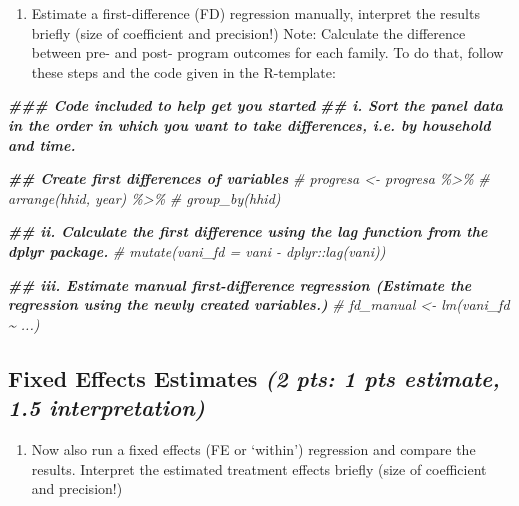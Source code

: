 \documentclass[
]{article}
\newenvironment{Shaded}{\begin{snugshade}}{\end{snugshade}}
\newcommand{\CommentTok}[1]{\textcolor[rgb]{0.56,0.35,0.01}{\textit{#1}}}
\newcommand{\DocumentationTok}[1]{\textcolor[rgb]{0.56,0.35,0.01}{\textbf{\textit{#1}}}}
\providecommand{\tightlist}{%
  \setlength{\itemsep}{0pt}\setlength{\parskip}{0pt}}
\begin{document}
\begin{enumerate}
\def\labelenumi{\alph{enumi})}
\tightlist
\item
  Estimate a first-difference (FD) regression manually, interpret the
  results briefly (size of coefficient and precision!) \indent *Note:
  Calculate the difference between pre- and post- program outcomes for
  each family. To do that, follow these steps and the code given in the
  R-template:
\end{enumerate}

\begin{Shaded}
\begin{Highlighting}[]
\DocumentationTok{\#\#\# Code included to help get you started}
\DocumentationTok{\#\# i. Sort the panel data in the order in which you want to take differences, i.e. by household and time.}

\DocumentationTok{\#\# Create first differences of variables}
\CommentTok{\# progresa \textless{}{-} progresa \%\textgreater{}\% }
\CommentTok{\#   arrange(hhid, year) \%\textgreater{}\% }
\CommentTok{\#   group\_by(hhid)}

\DocumentationTok{\#\# ii. Calculate the first difference using the lag function from the dplyr package.}
\CommentTok{\#     mutate(vani\_fd = vani {-} dplyr::lag(vani)) }

\DocumentationTok{\#\# iii. Estimate manual first{-}difference regression (Estimate the regression using the newly created variables.)}
\CommentTok{\# fd\_manual \textless{}{-} lm(vani\_fd \textasciitilde{} ...)}
\end{Highlighting}
\end{Shaded}

\hypertarget{fixed-effects-estimates-2-pts-1-pts-estimate-1.5-interpretation}{%
\subsection{\texorpdfstring{Fixed Effects Estimates \emph{(2 pts: 1 pts
estimate, 1.5
interpretation)}}{Fixed Effects Estimates (2 pts: 1 pts estimate, 1.5 interpretation)}}\label{fixed-effects-estimates-2-pts-1-pts-estimate-1.5-interpretation}}

\begin{enumerate}
\def\labelenumi{\alph{enumi})}
\setcounter{enumi}{1}
\tightlist
\item
  Now also run a fixed effects (FE or `within') regression and compare
  the results. Interpret the estimated treatment effects briefly (size
  of coefficient and precision!)
\end{enumerate}
\end{document}
